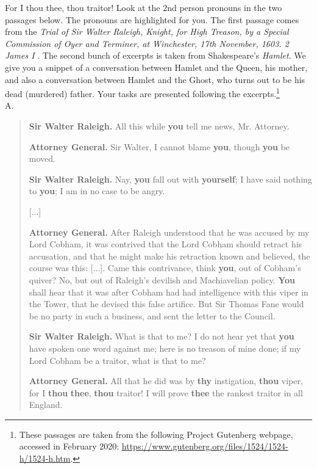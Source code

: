 \begin{exercises}{For I thou thee, thou traitor!}\label{ex-thou}
Look at the 2nd person pronouns in the two passages below. The pronouns are highlighted for you. The first passage comes from the \textit{Trial of Sir Walter Raleigh, Knight, for High Treason, by a Special Commission of Oyer and Terminer, at Winchester, 17th November, 1603. 2 James I} \citep[408--410]{Jardine1832}. The second bunch of excerpts is taken from Shakespeare's \textit{Hamlet}. We give you a snippet of a conversation between Hamlet and the Queen, his mother, and also a conversation between Hamlet and the Ghost, who turns out to be his dead (murdered) father. Your tasks are presented following the excerpts.\footnote{These passages are taken from the following Project Gutenberg webpage, accessed in February 2020: \url{https://www.gutenberg.org/files/1524/1524-h/1524-h.htm}.}\\

\noindent A.
\begin{quote}
    \textbf{Sir Walter Raleigh.} All this while \textbf{you} tell me news, Mr. Attorney.
    
    \textbf{Attorney General.} Sir Walter, I cannot blame \textbf{you}, though \textbf{you} be moved.
    
    \textbf{Sir Walter Raleigh.} Nay, \textbf{you} fall out with \textbf{yourself}; I have said nothing to \textbf{you}; I am in no case to be angry.

    [...]

    \textbf{Attorney General.} After Raleigh understood that he was accused by my Lord Cobham, it was contrived that the Lord Cobham should retract his accusation, and that he might make his retraction known and believed, the course was this: [...]. Came this contrivance, think \textbf{you}, out of Cobham's quiver? No, but out of Raleigh's devilish and Machiavelian policy. \textbf{You} shall hear that it was after Cobham had had intelligence with this viper in the Tower, that he devised this false artifice. But Sir Thomas Fane would be no party in such a business, and sent the letter to the Council.
    
    \textbf{Sir Walter Raleigh.} What is that to me? I do not hear yet that \textbf{you} have spoken one word against me; here is no treason of mine done; if my Lord Cobham be a traitor, what is that to me?
    
    \textbf{Attorney General.} All that he did was by \textbf{thy} instigation, \textbf{thou} viper, for I \textbf{thou} \textbf{thee}, \textbf{thou} traitor! I will prove \textbf{thee} the rankest traitor in all England.
    

\end{quote}
\end{exercises}
